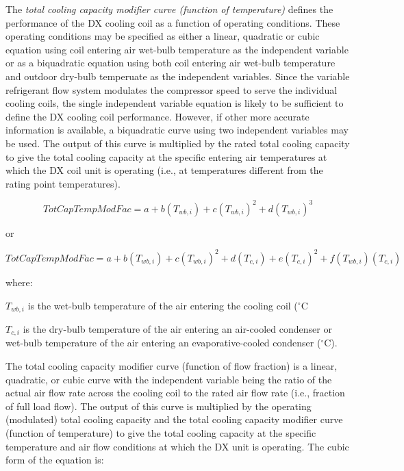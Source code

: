 The \emph{total cooling capacity modifier curve (function of temperature)} defines the performance of the DX cooling coil as a function of operating conditions. These operating conditions may be specified as either a linear, quadratic or cubic equation using coil entering air wet-bulb temperature as the independent variable or as a biquadratic equation using both coil entering air wet-bulb temperature and outdoor dry-bulb temperuate as the independent variables. Since the variable refrigerant flow system modulates the compressor speed to serve the individual cooling coils, the single independent variable equation is likely to be sufficient to define the DX cooling coil performance. However, if other more accurate information is available, a biquadratic curve using two independent variables may be used. The output of this curve is multiplied by the rated total cooling capacity to give the total cooling capacity at the specific entering air temperatures at which the DX coil unit is operating (i.e., at temperatures different from the rating point temperatures).

\begin{equation}
TotCapTempModFac = a + b\left( {{T_{wb,i}}} \right) + c{\left( {{T_{wb,i}}} \right)^2} + d{\left( {{T_{wb,i}}} \right)^3}
\end{equation}

or

\begin{equation}
TotCapTempModFac = a + b\left( {{T_{wb,i}}} \right) + c{\left( {{T_{wb,i}}} \right)^2} + d\left( {{T_{c,i}}} \right) + e{\left( {{T_{c,i}}} \right)^2} + f\left( {{T_{wb,i}}} \right)\left( {{T_{c,i}}} \right)
\end{equation}

where:

\({{T_{wb,i}}}\) is the wet-bulb temperature of the air entering the cooling coil (\(^{\circ}\)C

\({{T_{c,i}}}\) is the dry-bulb temperature of the air entering an air-cooled condenser or wet-bulb temperature of the air entering an evaporative-cooled condenser (\(^{\circ}\)C).

The total cooling capacity modifier curve (function of flow fraction) is a linear, quadratic, or cubic curve with the independent variable being the ratio of the actual air flow rate across the cooling coil to the rated air flow rate (i.e., fraction of full load flow). The output of this curve is multiplied by the operating (modulated) total cooling capacity and the total cooling capacity modifier curve (function of temperature) to give the total cooling capacity at the specific temperature and air flow conditions at which the DX unit is operating. The cubic form of the equation is:

